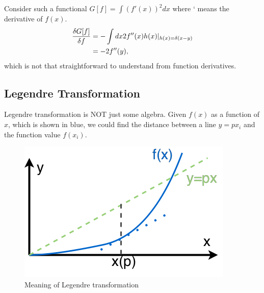 \documentclass[letterpaper,10pt,english]{sphinxmanual}
\begin{document}
Consider such a functional \(G[f]=\int (f'(x))^2 dx\) where ` means the derivative of \(f(x)\).
\begin{gather}
\begin{split}\frac{\delta G[f]}{\delta f} & = -\int dx 2 f''(x) h(x) \vert_{h(x)=\delta(x-y)}  \\
& = -2 f''(y) ,\end{split}\notag
\end{gather}
which is not that straightforward to understand from function derivatives.


\subsection{Legendre Transformation}
\label{voc/vocabulary:legendre-transformation}
Legendre transformation is NOT just some algebra. Given \(f(x)\) as a function of \(x\), which is shown in blue, we could find the distance between a line \(y=px_i\) and the function value \(f(x_i)\).
\begin{figure}[htbp]
\centering
\capstart

\includegraphics{legendreTransformation.png}
\caption{Meaning of Legendre transformation}\end{figure}
\end{document}
